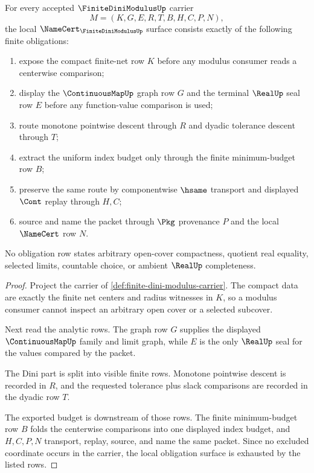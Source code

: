 \begin{theorem}
\label{thm:finite-dini-modulus-obligations}
For every accepted $\FiniteDiniModulusUp$ carrier
$$
M=(K,G,E,R,T,B,H,C,P,N),
$$
the local $\NameCert_{\FiniteDiniModulusUp}$ surface consists exactly of the following finite obligations:
\begin{enumerate}
\item expose the compact finite-net row $K$ before any modulus consumer reads a centerwise comparison;
\item display the $\ContinuousMapUp$ graph row $G$ and the terminal $\RealUp$ seal row $E$ before any function-value comparison is used;
\item route monotone pointwise descent through $R$ and dyadic tolerance descent through $T$;
\item extract the uniform index budget only through the finite minimum-budget row $B$;
\item preserve the same route by componentwise $\hsame$ transport and displayed $\Cont$ replay through $H,C$;
\item source and name the packet through $\Pkg$ provenance $P$ and the local $\NameCert$ row $N$.
\end{enumerate}
No obligation row states arbitrary open-cover compactness, quotient real equality, selected limits, countable choice, or ambient $\RealUp$ completeness.
\end{theorem}
\begin{proof}
Project the carrier of \autoref{def:finite-dini-modulus-carrier}. The compact data are exactly the finite net centers and radius witnesses in $K$, so a modulus consumer cannot inspect an arbitrary open cover or a selected subcover.

Next read the analytic rows. The graph row $G$ supplies the displayed $\ContinuousMapUp$ family and limit graph, while $E$ is the only $\RealUp$ seal for the values compared by the packet.

The Dini part is split into visible finite rows. Monotone pointwise descent is recorded in $R$, and the requested tolerance plus slack comparisons are recorded in the dyadic row $T$.

The exported budget is downstream of those rows. The finite minimum-budget row $B$ folds the centerwise comparisons into one displayed index budget, and $H,C,P,N$ transport, replay, source, and name the same packet. Since no excluded coordinate occurs in the carrier, the local obligation surface is exhausted by the listed rows.
\end{proof}

